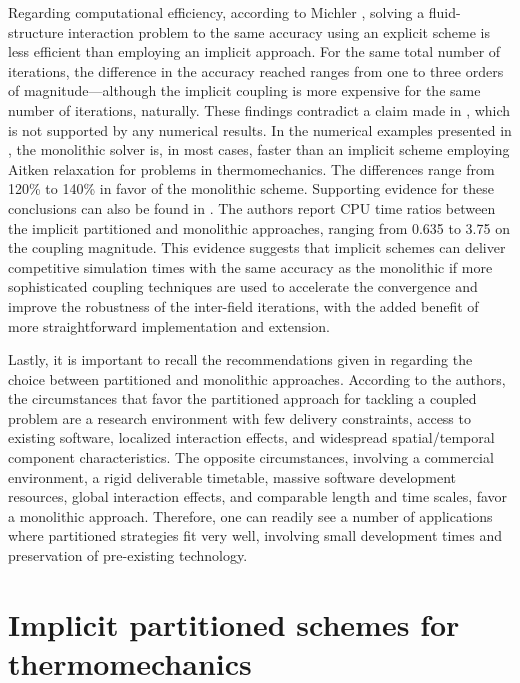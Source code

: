 Regarding computational efficiency, according to Michler \citep{michler_efficient_2005}, solving a fluid-structure interaction problem to the same accuracy using an explicit scheme is less efficient than employing an implicit approach.
For the same total number of iterations, the difference in the accuracy reached ranges from one to three orders of magnitude---although the implicit coupling is more expensive for the same number of iterations, naturally.
These findings contradict a claim made in \cite{felippa_partitioned_2001}, which is not supported by any numerical results.
In the numerical examples presented in \cite{danowski_computational_2014}, the monolithic solver is, in most cases, faster than an implicit scheme employing Aitken relaxation for problems in thermomechanics.
The differences range from 120\% to 140\% in favor of the monolithic scheme.
Supporting evidence for these conclusions can also be found in \cite{novascone_evaluation_2015}.
The authors report  CPU time ratios between the implicit partitioned and monolithic approaches, ranging from 0.635 to 3.75 on the coupling magnitude.
This evidence suggests that implicit schemes can deliver competitive simulation times with the same accuracy as the monolithic if more sophisticated coupling techniques are used to accelerate the convergence and improve the robustness of the inter-field iterations, with the added benefit of more straightforward implementation and extension.

Lastly, it is important to recall the recommendations given in \cite{felippa_partitioned_2001} regarding the choice between partitioned and monolithic approaches.
According to the authors, the circumstances that favor the partitioned approach for tackling a coupled problem are a research environment with few delivery constraints, access to existing software, localized interaction effects, and widespread spatial/temporal component characteristics.
The opposite circumstances, involving a commercial environment, a rigid deliverable timetable, massive software development resources, global interaction effects, and comparable length and time scales, favor a monolithic approach.
Therefore, one can readily see a number of applications where partitioned strategies fit very well, involving small development times and preservation of pre-existing technology.

\section{Implicit partitioned schemes for thermomechanics} \label{sec:implicit_solution_coupl}

